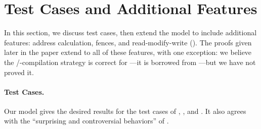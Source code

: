\section{Test Cases and Additional Features}
\label{sec:variants}

In this section, we discuss test cases, then extend the model to include
additional features: address calculation, fences, and read-modify-write
(\RMW).  The proofs given later in the paper extend to all of these features,
with one exception: we believe the \armeight/\tso-compilation strategy is
correct for \RMW---it is borrowed from
\citet{DBLP:journals/pacmpl/PodkopaevLV19}---but we have not proved it.

\paragraph{Test Cases.}
Our model gives the desired results for the test cases of \citet{PughWebsite},
\citet[]{SevcikThesis}, and \citet[]{DBLP:conf/esop/BattyMNPS15}.  It also agrees with the ``surprising and
controversial behaviors'' of \citet[]{Manson:2005:JMM:1047659.1040336}.

